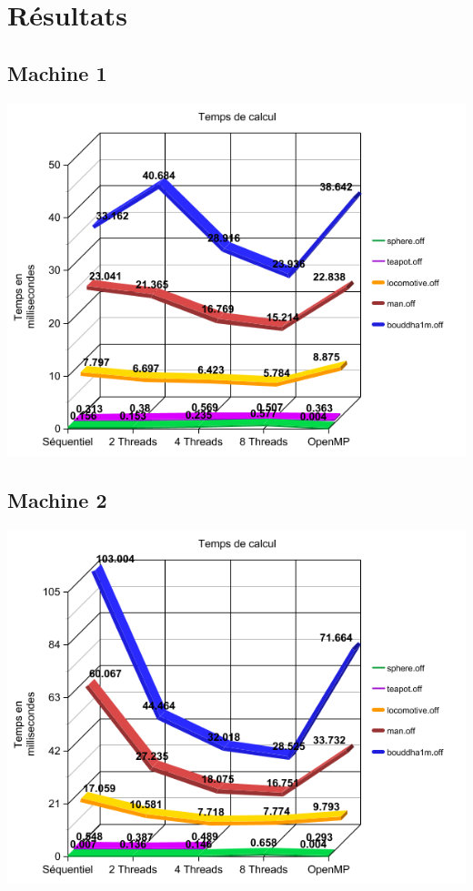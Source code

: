 \documentclass[a4paper]{article}
\begin{document}
\section{Résultats}
	\subsection{Machine 1}
	\begin{center}
		\includegraphics[scale = 0.5]{graph_execTime_machine1.png}
	\end{center}

	\subsection{Machine 2}
	\begin{center}
		\includegraphics[scale = 0.5]{graph_execTime_machine2.png}
	\end{center}
	
\end{document}
